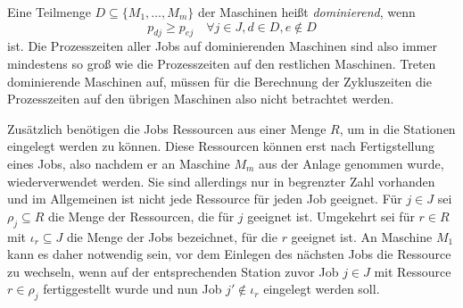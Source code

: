 \documentclass{scrreprt}
\begin{document}
Eine Teilmenge $D \subseteq \{M_1,\ldots,M_m\}$ der Maschinen heißt \textit{dominierend}, wenn 
\[ p_{dj} \geq p_{ej} \quad \forall j\in J, d\in D, e\not\in D \] 
ist. Die Prozesszeiten aller Jobs auf dominierenden Maschinen sind also immer mindestens so groß wie die Prozesszeiten auf den restlichen Maschinen.
Treten dominierende Maschinen auf, müssen für die Berechnung der Zykluszeiten die Prozesszeiten auf den übrigen Maschinen also nicht betrachtet werden.

Zusätzlich benötigen die Jobs Ressourcen aus einer Menge $R$, um in die Stationen eingelegt werden zu können. Diese Ressourcen können erst nach
Fertigstellung eines Jobs, also nachdem er an Maschine $M_m$ aus der Anlage genommen wurde, wiederverwendet werden.
Sie sind allerdings nur in begrenzter Zahl vorhanden und im Allgemeinen ist nicht jede Ressource für jeden Job geeignet.
Für $j\in J$ sei $\rho_j\subseteq R$ die Menge der Ressourcen, die für $j$ geeignet ist.
Umgekehrt sei für $r\in R$ mit $\iota_r\subseteq J$ die Menge der Jobs bezeichnet, für die $r$ geeignet ist.
An Maschine $M_1$ kann es daher notwendig sein, vor dem Einlegen des nächsten Jobs die Ressource zu wechseln, 
wenn auf der entsprechenden Station zuvor Job $j\in J$ mit Ressource $r\in\rho_j$ fertiggestellt wurde 
und nun Job $j'\not\in\iota_r$ eingelegt werden soll.
\end{document}
